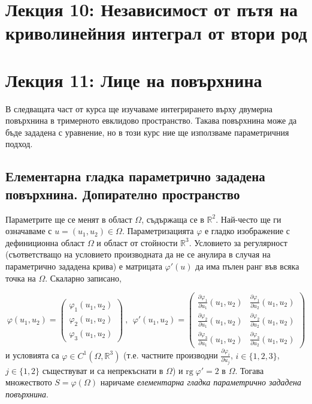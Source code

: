 \documentclass[11pt]{article}
\numberwithin{equation}{section}
\numberwithin{figure}{section}
\numberwithin{table}{section}
\theoremstyle{plain}
\theoremstyle{definition}
\theoremstyle{remark}
\theoremstyle{definition}
\theoremstyle{remark}
\theoremstyle{plain}
\theoremstyle{definition}
\theoremstyle{definition}
\theoremstyle{plain}
\theoremstyle{plain}
\theoremstyle{plain}
\theoremstyle{definition}
\theoremstyle{plain}
\newcommand*{\R}{\mathbb{R}}
\begin{document}
\section{Лекция 10: Независимост от пътя на криволинейния интеграл от втори род}

\newpage

\section{Лекция 11: Лице на повърхнина}

В следващата част от курса ще изучаваме интегрирането върху двумерна повърхнина в тримерното евклидово пространство. Такава повърхнина може да бъде зададена с уравнение, но в този курс ние ще използваме параметричния подход.

\subsection{Елементарна гладка параметрично зададена повърхнина. Допирателно пространство}

Параметрите ще се менят в област $\Omega$, съдържаща се в $\R^2$. Най-често ще ги означаваме с $u=(u_1,u_2)\in \Omega$. Параметризацията $\varphi$ е гладко изображение с дефиниционна област $\Omega$ и област от стойности $\R^3$. Условието за регулярност (съответстващо на условието производната да не се анулира в случая на параметрично зададена крива) е матрицата $\varphi'(u)$ да има пълен ранг във всяка точка на $\Omega$. Скаларно
 записано,

$$\varphi(u_1,u_2)=\left( \begin{array}{c}\varphi_1(u_1,u_2)\\\varphi_2(u_1,u_2)\\\varphi_3(u_1,u_2)\end{array}\right) \ , \ \
\varphi'(u_1,u_2)=\left( \begin{array}{cc}\frac{\partial\varphi_1}{\partial u_1}(u_1,u_2)&\frac{\partial\varphi_1}{\partial u_2}(u_1,u_2)\\ \frac{\partial\varphi_2}{\partial u_1}(u_1,u_2)&\frac{\partial\varphi_2}{\partial u_2}(u_1,u_2)\\ \frac{\partial\varphi_3}{\partial u_1}(u_1,u_2)&\frac{\partial\varphi_3}{\partial u_2}(u_1,u_2)\end{array}\right)$$
и условията са $\varphi \in C^1(\Omega,\R^3)$ (т.е. частните производни $\frac{\partial\varphi_i}{\partial u_j}$, $i\in \{ 1,2,3\}$, $j\in \{ 1,2\}$ съществуват и са непрекъснати в $\Omega$) и $\textrm{rg} \; \varphi' =2$ в $\Omega$. Тогава множеството $S=\varphi(\Omega)$ наричаме \textit{елементарна гладка параметрично зададена повърхнина}.
\end{document}
